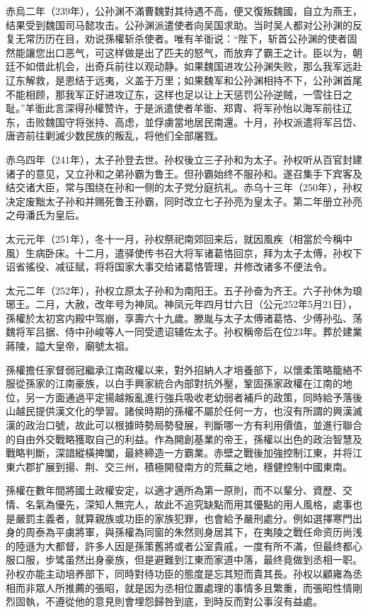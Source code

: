 赤烏二年（239年），公孙渊不滿曹魏對其待遇不高，便又復叛魏國，自立为燕王，结果受到魏国司马懿攻击。公孙渊派遣使者向吴国求助。当时吴人都对公孙渊的反复无常历历在目，劝说孫權斩杀使者。唯有羊衜说：“陛下，斩首公孙渊的使者固然能讓您出口恶气，可这样做是出了匹夫的怒气，而放弃了霸王之计。臣以为，朝廷不如借此机会，出奇兵前往以观动静。如果魏国进攻公孙渊失败，那么我军远赴辽东解救，是恩结于远夷，义盖于万里；如果魏军和公孙渊相持不下，公孙渊首尾不能相顾，那我军正好进攻辽东，这样也足以让上天惩罚公孙逆贼，一雪往日之耻。”羊衜此言深得孙權赞许，于是派遣使者羊衜、郑胄、将军孙怡以海军前往辽东，击败魏国守将张持、高虑，並俘虜當地居民南還。十月，孙权派遣将军吕岱、唐咨前往剿滅少数民族的叛乱，将他们全部屠戮。

赤乌四年（241年），太子孙登去世。孙权後立三子孙和为太子。孙权听从百官封建诸子的意见，又立孙和之弟孙霸为鲁王。但孙霸始终不服孙和。遂召集手下宾客及结交诸大臣，常与围绕在孙和一侧的太子党分庭抗礼。赤乌十三年（250年），孙权决定废黜太子孙和并赐死鲁王孙霸，同时改立七子孙亮为皇太子。第二年册立孙亮之母潘氏为皇后。

太元元年（251年），冬十一月，孙权祭祀南郊回来后，就因風疾（相當於今稱中風）生病卧床。十二月，遣驿使传书召大将军诸葛恪回京，拜为太子太傅，孙权下诏省徭役、减征赋，将将国家大事交给诸葛恪管理，并修改诸多不便法令。

太元二年（252年），孙权立原太子孙和为南阳王。五子孙奋为齐王。六子孙休为琅琊王。二月，大赦，改年号为神凤。神凤元年四月廿六日（公元252年5月21日），孫權於太初宮内殿中驾崩，享壽六十九歲。滕胤与太子太傅诸葛恪、少傅孙弘、荡魏将军吕据、侍中孙峻等人一同受遗诏辅佐太子。孙权稱帝后在位23年。葬於建業蔣陵，謚大皇帝，廟號太祖。

孫權擔任家督弱冠繼承江南政權以来，對外招納人才培養部下，以懷柔策略籠絡不服從孫家的江南豪族，以白手興家統合內部對抗外壓，鞏固孫家政權在江南的地位，另一方面通過平定揚越叛亂進行強兵吸收老幼弱者補戶的政策，同時給予落後山越民提供漢文化的學習。諸侯時期的孫權不屬於任何一方，也沒有所謂的興漢滅漢的政治口號，故此可以根據時勢局勢發展，判斷哪一方有利用價值，並進行聯合的自由外交戰略獲取自己的利益。作為開創基業的帝王，孫權以出色的政治智慧及戰略判斷，深諳縱橫捭闔，最終締造一方霸業。赤壁之戰後加強控制江東，并将江東六郡扩展到揚、荆、交三州，積極開發南方的荒蕪之地，穩健控制中國東南。

孫權在數年間將國土政權安定，以適才適所為第一原則，而不以輩分、資歷、交情、名氣為優先，深知人無完人，故此不追究缺點而用其優點的用人風格，處事也是嚴罰主義者，就算親族或功臣的家族犯罪，也會給予嚴刑處分。例如選擇寒門出身的周泰為平虜將軍，與孫權為同窗的朱然则身居其下，在夷陵之戰任命资历尚浅的陸遜为大都督，許多人因是孫策舊將或者公室貴戚，一度有所不滿，但最终都心服口服，步骘虽然出身豪族，但是避難到江東而家道中落，最终竟做到丞相一职。孙权亦能主动培养部下，同時對待功臣的態度是忘其短而貴其長。孙权以顧雍為丞相而非眾人所推薦的張昭，就是因为丞相位置處理的事情多且繁重，而張昭性情剛烈固執，不遵從他的意見則會埋怨歸咎到底，到時反而對公事沒有益處。

